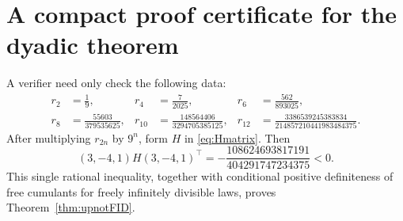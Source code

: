 \documentclass[11pt,oneside]{article}
\theoremstyle{definition}
\theoremstyle{remark}
\begin{document}
\section{A compact proof certificate for the dyadic theorem}
A verifier need only check the following data:
\begin{align*}
r_2&=\frac19,&
r_4&=\frac7{2025},&
r_6&=\frac{562}{893025},\\
r_8&=\frac{55603}{379535625},&
r_{10}&=\frac{148564406}{3294705385125},&
r_{12}&=\frac{3386539245383834}{214857210441983484375}.
\end{align*}
After multiplying \(r_{2n}\) by \(9^n\), form \(H\) in \eqref{eq:Hmatrix}. Then
\[
(3,-4,1)H(3,-4,1)^\top
=-\frac{108624693817191}{404291747234375}<0.
\]
This single rational inequality, together with conditional positive definiteness of free cumulants for freely infinitely divisible laws, proves Theorem~\ref{thm:upnotFID}.
\end{document}
